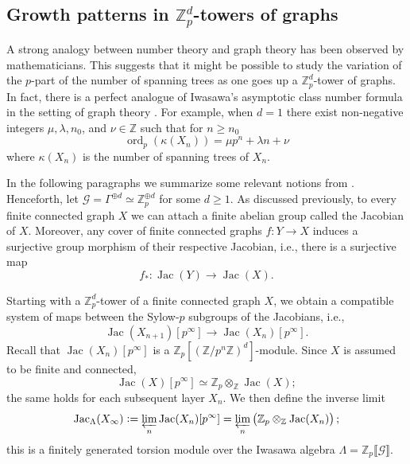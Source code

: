 \documentclass{amsart}
\numberwithin{equation}{section}
\theoremstyle{remark}
\newcommand{\Jac}{\operatorname{Jac}}
\newcommand{\ord}{\operatorname{ord}}
\newcommand{\Z}{\mathbb{Z}}
\newcommand{\cG}{\mathcal{G}}
\theoremstyle{plain} %
\begin{document}



\subsection{Growth patterns in \texorpdfstring{$\Z_p^d$}{}-towers of graphs}
A strong analogy between number theory and graph theory has been observed by mathematicians.
This suggests that it might be possible to study the variation of the $p$-part of the number of spanning trees as one goes up a $\Z^d_p$-tower of graphs.
In fact, there is a perfect analogue of Iwasawa’s asymptotic class number formula in the setting of graph theory \cite{Val21, gonet2022iwasawa}.
For example, when $d=1$ there exist non-negative integers $\mu, \lambda, n_0$, and $\nu \in \Z$ such that for $n\geq n_0$
\[
\ord_p(\kappa(X_n)) = \mu p^n + \lambda n + \nu
\]
where $\kappa(X_n)$ is the number of spanning trees of $X_n$.

In the following paragraphs we summarize some relevant notions from \cite{Kleine-Mueller4}.
Henceforth, let $\cG = {\Gamma^{\oplus d} \simeq} \Z_p^{\oplus d}$ for some $d\geq 1$.
As discussed previously, to every finite connected graph $X$ we can attach a finite abelian group called the Jacobian of $X$.
Moreover, any cover of finite connected graphs $f \colon Y \to X$ induces a surjective group morphism of their respective Jacobian, i.e., there is a surjective map
\[
f_* \colon \Jac(Y) \longrightarrow \Jac(X).
\]

Starting with a $\Z^d_p$-tower of a finite connected graph $X$, we obtain a compatible system of maps between the Sylow-$p$ subgroups of the Jacobians, i.e.,
\[
\Jac(X_{n+1})[p^\infty] \longrightarrow \Jac(X_n)[p^\infty].
\]
Recall that $\Jac(X_n)[p^\infty]$ is a $\Z_p[(\Z/p^n\Z)^d]$-module.
Since $X$ is assumed to be finite and connected,
\[
\Jac(X)[p^\infty] \simeq \Z_p \otimes_{\Z} \Jac(X);
\]
the same holds for each subsequent layer $X_n$.
We then define the inverse limit 
\[
\Jac_{\Lambda}(X_\infty) := \varprojlim_{n} \Jac(X_n)[p^\infty] = \varprojlim_{n} \left( \Z_p \otimes_{\Z} \Jac(X_n) \right);
\]
this is a finitely generated torsion module over the Iwasawa algebra $\Lambda=\Z_p\llbracket \mathcal{G}\rrbracket$.
\end{document}
